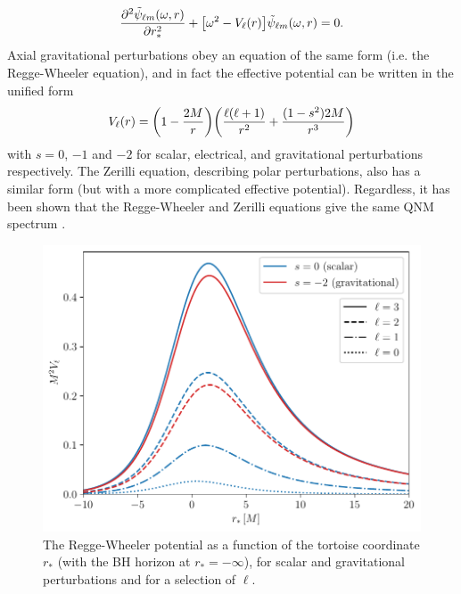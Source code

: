 \begin{equation}\label{eq:fd_wave_equation}
    \pdv[2]{\tilde{\psi}_{\ell m}(\omega,r)}{r_*} + \qty[ \omega^2 - V_\ell(r)] \tilde{\psi}_{\ell m}(\omega,r) = 0.
\end{equation}
Axial gravitational perturbations obey an equation of the same form (i.e. the Regge-Wheeler equation), and in fact the effective potential can be written in the unified form
\begin{equation}
    V_\ell(r) = \qty( 1 - \frac{2M}{r} ) \qty( \frac{\ell (\ell + 1)}{r^2} + \frac{(1 - s^2)2M}{r^3} )
\end{equation}
with $s = 0$, $-1$ and $-2$ for scalar, electrical, and gravitational perturbations respectively. 
The Zerilli equation, describing polar perturbations, also has a similar form (but with a more complicated effective potential). 
Regardless, it has been shown that the Regge-Wheeler and Zerilli equations give the same QNM spectrum \cite{Chandrasekhar:1975nkd}.

\begin{figure}[t]
    \centering
    \includegraphics[width=0.8\columnwidth]{Figures/Introduction/rw_potential.pdf}
    \caption[The Regge-Wheeler potential]{The Regge-Wheeler potential as a function of the tortoise coordinate $r_*$ (with the BH horizon at $r_* = -\infty$), for scalar and gravitational perturbations and for a selection of $\ell$.}
    \label{fig:rw_potential}
\end{figure}

